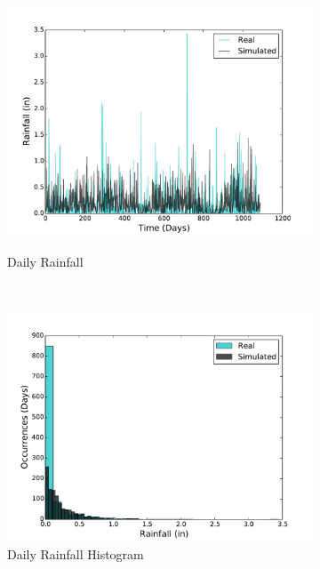 \documentclass[11pt, letterpaper]{article}
\begin{document}
\begin{figure}[H]
\begin{subfigure}[b]{0.45\textwidth}
    \includegraphics[width=\textwidth]{figures/daily_rainfall.pdf}
    \label{fig:analysis-raw}
    \caption{Daily Rainfall}
  \end{subfigure}
  ~
  \begin{subfigure}[b]{0.45\textwidth}
    \includegraphics[width=\textwidth]{figures/daily_rainfall_hist}
    \caption{Daily Rainfall Histogram}
  \end{subfigure}
  \label{fig:analysis}
  \caption{}
\end{figure}
\end{document}

